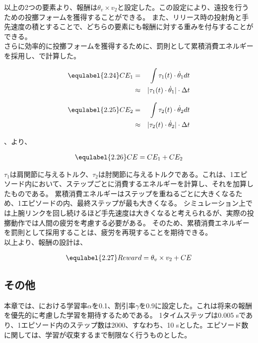 以上の2つの要素より、報酬は$\theta_{v} \times v_{2}$と設定した。この設定により、遠投を行うための投擲フォームを獲得することができる。
また、リリース時の投射角と手先速度の積とすることで、どちらの要素にも報酬に対する重みを付与することができる。\\
さらに効率的に投擲フォームを獲得するために、罰則として累積消費エネルギーを採用し、で計算した。

\begin{eqnarray}
  \equlabel{2.24}
  CE_{1}&=&\int \tau_{1}(t)\cdot\dot{\theta}_{1} dt\\
        &\approx&|\tau_{1}(t)\cdot\dot{\theta}_{1}|\cdot\Delta t
\end{eqnarray}

\begin{eqnarray}
  \equlabel{2.25}
  CE_{2}&=&\int \tau_{2}(t)\cdot\dot{\theta}_{2} dt\\
        &\approx&|\tau_{2}(t)\cdot\dot{\theta}_{2}|\cdot\Delta t
\end{eqnarray}

、より、

\begin{eqnarray}
  \equlabel{2.26}
  CE = CE_{1} + CE_{2}
\end{eqnarray}

$\tau_{1}$は肩関節に与えるトルク、$\tau_{2}$は肘関節に与えるトルクである。これは、1エピソード内において、ステップごとに消費するエネルギーを計算し、それを加算したものである。
累積消費エネルギーはステップを重ねるごとに大きくなるため、1エピソードの内、最終ステップが最も大きくなる。
シミュレーション上では上腕リンクを回し続けるほど手先速度は大きくなると考えられるが、実際の投擲動作では人間の疲労を考慮する必要がある。
そのため、累積消費エネルギーを罰則として採用することは、疲労を再現することを期待できる。\\
以上より、報酬の設計は、

\begin{eqnarray}
  \equlabel{2.27}
  Reward = \theta_{v} \times v_{2} + CE
\end{eqnarray}

\subsection{その他}
本章では、における学習率$\alpha$を0.1、割引率$\gamma$を0.9に設定した。これは将来の報酬を優先的に考慮した学習を期待するためである。
1タイムステップは0.005 sであり、1エピソード内のステップ数は2000、すなわち、10 sとした。エピソード数に関しては、学習が収束するまで制限なく行うものとした。
